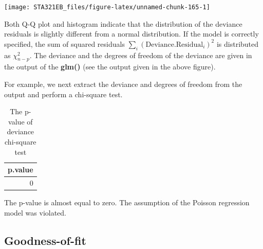 \documentclass[
]{book}
\newenvironment{Shaded}{\begin{snugshade}}{\end{snugshade}}
\newcommand{\AttributeTok}[1]{\textcolor[rgb]{0.13,0.29,0.53}{#1}}
\newcommand{\CommentTok}[1]{\textcolor[rgb]{0.56,0.35,0.01}{\textit{#1}}}
\newcommand{\DecValTok}[1]{\textcolor[rgb]{0.00,0.00,0.81}{#1}}
\newcommand{\FunctionTok}[1]{\textcolor[rgb]{0.13,0.29,0.53}{\textbf{#1}}}
\newcommand{\NormalTok}[1]{#1}
\newcommand{\OtherTok}[1]{\textcolor[rgb]{0.56,0.35,0.01}{#1}}
\newcommand{\SpecialCharTok}[1]{\textcolor[rgb]{0.81,0.36,0.00}{\textbf{#1}}}
\newcommand{\StringTok}[1]{\textcolor[rgb]{0.31,0.60,0.02}{#1}}
\begin{document}
\begin{center}\texttt{[image: STA321EB\_files/figure-latex/unnamed-chunk-165-1]} \end{center}

Both Q-Q plot and histogram indicate that the distribution of the deviance residuals is slightly different from a normal distribution. If the model is correctly specified, the sum of squared residuals \(\sum_i(\text{Deviance.Residual}_i)^2\) is distributed as \(\chi^2_{n-p}\). The deviance and the degrees of freedom of the deviance are given in the output of the \textbf{glm()} (see the output given in the above figure).

For example, we next extract the deviance and degrees of freedom from the output and perform a chi-square test.

\begin{Shaded}
\end{Shaded}

\begin{table}

\caption{\label{tab:unnamed-chunk-166}The p-value of deviance chi-square test}
\centering
\begin{tabular}[t]{r}
\hline
p.value\\
\hline
0\\
\hline
\end{tabular}
\end{table}

The p-value is almost equal to zero. The assumption of the Poisson regression model was violated.

\hypertarget{goodness-of-fit}{%
\subsection{Goodness-of-fit}\label{goodness-of-fit}}
\end{document}
